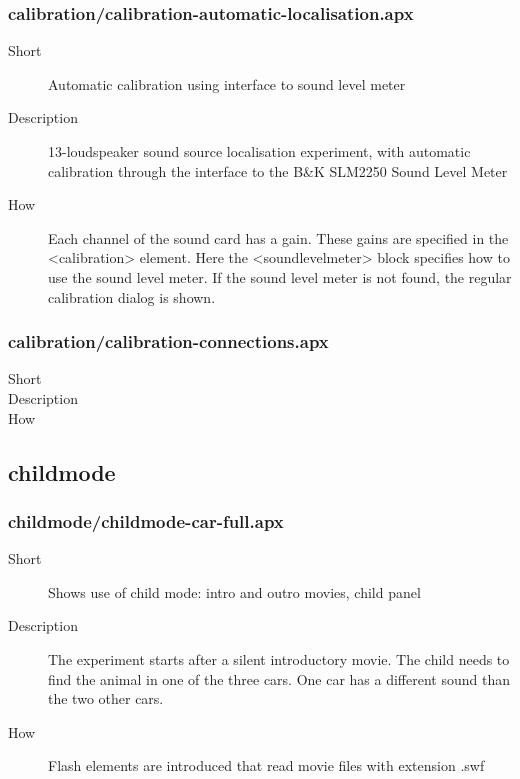 \subsubsection{calibration/calibration-automatic-localisation.apx}
\begin{description}
\item[Short] 
 Automatic calibration using interface to sound level meter
\item[Description] 
 13-loudspeaker sound source localisation experiment, with automatic calibration through the interface to the B\&K SLM2250 Sound Level Meter
\item[How] 
 Each channel of the sound card has a gain. These gains are specified in the \textless{}calibration\textgreater{} element. Here the \textless{}soundlevelmeter\textgreater{} block specifies how to use the sound level meter. If the sound level meter is not found, the regular calibration dialog is shown.
\end{description}

\subsubsection{calibration/calibration-connections.apx}
\begin{description}
\item[Short] 

\item[Description] 

\item[How] 

\end{description}

\subsection{childmode}
\subsubsection{childmode/childmode-car-full.apx}
\begin{description}
\item[Short] 
 Shows use of child mode: intro and outro movies, child panel
\item[Description] 
 The experiment starts after a silent introductory movie. The child needs to find the animal in one of the three cars. One car has a different sound than the two other cars.
\item[How] 
 Flash elements are introduced that read movie files with extension .swf
\end{description}

